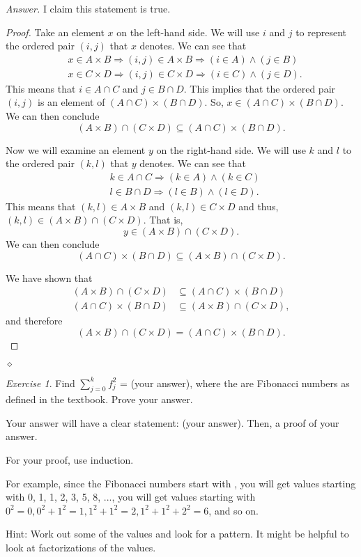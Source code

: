 \documentclass[12pt,oneside]{amsart}
\theoremstyle{remark}
\newtheorem{exer}{Exercise}
\newenvironment{answer}{\bigskip\noindent\emph{Answer.}}{\hfill$\diamond$\newline}
\begin{document}
\begin{answer}
I claim this statement is true.

\begin{proof}
Take an element $x$ on the left-hand side. We will use $i$ and $j$ to represent the ordered pair $(i, j)$ that $x$ denotes. We can see that
\begin{align*}
&x \in A \times B \Rightarrow (i, j) \in A \times B \Rightarrow (i \in A) \wedge (j \in B) \\
&x \in C \times D \Rightarrow (i, j) \in C \times D \Rightarrow (i \in C) \wedge (j \in D).
\end{align*} This means that $i \in A \cap C$ and $j \in B \cap D$. This implies that the ordered pair $(i, j)$ is an element of $(A \cap C) \times (B \cap D).$ So, $x \in (A \cap C) \times (B \cap D)$. We can then conclude \[ (A \times B) \cap (C \times D) \subseteq (A \cap C) \times (B \cap D). \]

Now we will examine an element $y$ on the right-hand side. We will use $k$ and $l$ to the ordered pair $(k, l)$ that $y$ denotes. We can see that
\begin{align*}
&k \in A \cap C \Rightarrow (k \in A) \wedge (k \in C) \\
&l \in B \cap D \Rightarrow (l \in B) \wedge (l \in D).
\end{align*} This means that $(k, l) \in A \times B$ and $(k, l) \in C \times D$ and thus, $(k, l) \in (A \times B) \cap (C \times D)$. That is, \[ y \in (A \times B) \cap (C \times D). \] We can then conclude \[ (A \cap C) \times (B \cap D) \subseteq (A \times B) \cap (C \times D). \]

We have shown that
\begin{align*}
(A \times B) \cap (C \times D) &\subseteq (A \cap C) \times (B \cap D) \\
(A \cap C) \times (B \cap D) &\subseteq (A \times B) \cap (C \times D),
\end{align*} and therefore \[ (A \times B) \cap (C \times D) = (A \cap C) \times (B \cap D). \]
\end{proof}
\end{answer}

%
%
%
%
\newpage
\begin{exer}
Find $\sum_{j = 0}^k f^2_j$ = (your answer), where the are Fibonacci numbers as defined in the textbook. Prove your answer.

Your answer will have a clear statement: (your answer). Then, a proof of your answer.

For your proof, use induction.

For example, since the Fibonacci numbers start with , you will get values starting with 0, 1, 1, 2, 3, 5, 8, ..., you will get values starting with $0^2 = 0, 0^2 + 1^2 = 1, 1^2 + 1^2 = 2, 1^2 + 1^2 + 2^2 = 6$, and so on.

Hint: Work out some of the values and look for a pattern. It might be helpful to look at factorizations of the values.
\end{exer}
\end{document}
